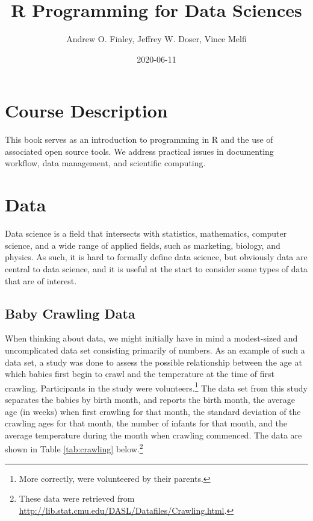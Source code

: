 \documentclass[
]{krantz}
\title{R Programming for Data Sciences}
\author{Andrew O. Finley, Jeffrey W. Doser, Vince Melfi}
\date{2020-06-11}
\begin{document}
\maketitle


\thispagestyle{empty}

\setlength{\abovedisplayskip}{-5pt}
\setlength{\abovedisplayshortskip}{-5pt}

{
\hypersetup{linkcolor=}
\setcounter{tocdepth}{2}
\tableofcontents
}
\listoftables
\listoffigures
\hypertarget{course-description}{%
\chapter*{Course Description}\label{course-description}}


This book serves as an introduction to programming in R and the use of associated open source tools. We address practical issues in documenting workflow, data management, and scientific computing.

\mainmatter

\hypertarget{data}{%
\chapter{Data}\label{data}}

Data science is a field that intersects with statistics, mathematics, computer science, and a wide range of applied fields, such as marketing, biology, and physics. As such, it is hard to formally define data science, but obviously data are central to data science, and it is useful at the start to consider some types of data that are of interest.

\hypertarget{baby-crawling-data}{%
\section{Baby Crawling Data}\label{baby-crawling-data}}

When thinking about data, we might initially have in mind a modest-sized and uncomplicated data set consisting primarily of numbers. As an example of such a data set, a study was done to assess the possible relationship between the age at which babies first begin to crawl and the temperature at the time of first crawling. Participants in the study were volunteers.\footnote{More correctly, were volunteered by their parents.} The data set from this study separates the babies by birth month, and reports the birth month, the average age (in weeks) when first crawling for that month, the standard deviation of the crawling ages for that month, the number of infants for that month, and the average temperature during the month when crawling commenced. The data are shown in Table \ref{tab:crawling} below.\footnote{These data were retrieved from \url{http://lib.stat.cmu.edu/DASL/Datafiles/Crawling.html}.}
\end{document}
